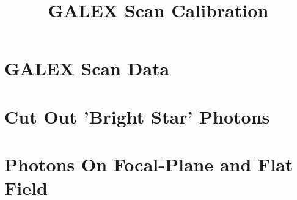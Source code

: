 \documentclass[]{article}
\begin{document}
\title{GALEX Scan Calibration}
\date{}
\maketitle

\section{GALEX Scan Data}

\section{Cut Out 'Bright Star' Photons}

\section{Photons On Focal-Plane and Flat Field}
\end{document}
